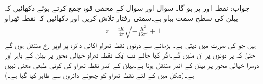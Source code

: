 جواب:\quad
نقطہ  اور  پر  ہو گا۔
\quad {}\quad
سوال  اور سوال  کے مخفی قوہ جمع کرتے ہوئے دکھائیں کہ بیلن کی سطح  سمت بہاو ہے۔سمتی رفتار تلاش کریں اور دکھائیں کہ نقطہ ٹھراو
\begin{align*}
z=\frac{iK}{4\pi}\sqrt{-\frac{K^2}{16\pi^2}+1}
\end{align*}
ہیں جو  کی صورت میں  دیتی ہے۔ بڑھانے سے دونوں نقطہ ٹھراو اکائی دائرہ پر اوپر رخ منتقل ہوں گے  حتیٰ کہ  پر دونوں  پر آن ملیں گے۔اگر   کیا جائے تب ایک نقطہ ٹھراو خیالی محور پر بیلن کے باہر اور دوسرا خیالی محور پر بیلن کے اندر منتقل ہوتا ہے۔بیلن کے اندر نقطہ ٹھراو کی کوئی طبعی معنی نہیں ہے۔(شکل  میں  کے لئے نقطہ ٹھراو کو چھوٹے دائروں سے ظاہر کیا گیا ہے۔)
